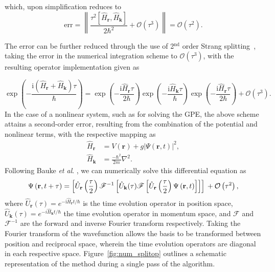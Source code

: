 which, upon simplification reduces to
\begin{equation}
\text{err} = \left\| \frac{\tau^2[{\hat{H}_{\textbf{r}}},{\hat{H}_{\textbf{k}}}]}{2\hbar^2} + \mathcal{O}(\tau^3)\right\| = \mathcal{O}(\tau^2).
\end{equation}

The error can be further reduced through the use of 2$^{\text{nd}}$ order Strang splitting~\cite{NUM:Gradinaru_SIAM_2007}, taking the error in the numerical integration scheme to $\mathcal{O}(\tau^3)$, with the resulting operator implementation given as

\begin{equation}\label{eqn:3}
\exp\left( -\frac{ \textrm{i}\left(\hat{H}_{\textbf{r}} + \hat{H}_{\textbf{k}}\right)\tau}{\hbar} \right) = \exp\left(- \frac{\textrm{i}\hat{H}_{\textbf{r}}\tau}{2\hbar} \right)\exp\left(-\frac{\textrm{i}\hat{H}_{\textbf{k}}\tau}{\hbar}\right)\exp\left( -\frac{\textrm{i}\hat{H}_{\textbf{r}}\tau}{2\hbar}\right) + \mathcal{O}\left(\tau^3\right).
\end{equation}
In the case of a nonlinear system, such as for solving the GPE, the above scheme attains a second-order error, resulting from the combination of the potential and nonlinear terms, with the respective mapping as \cite{BEC:Javanainen_jphysa_2006}
\begin{subequations}
    \begin{align}
\hat{H}_{\textbf{r}} &= V(\mathbf{r}) + g\vert\Psi(\mathbf{r},t)\vert^2, \\ \hat{H}_{\textbf{k}} &= \frac{-\hbar^2}{2m}\nabla^2.
    \end{align}
\end{subequations}
Following Bauke \textit{et al}. \cite{Num:Bauke_cpc_2011}, we can numerically solve this differential equation as
\begin{equation}
\Psi\left(\textbf{r},t+\tau\right) = \left[\hat{U}_{\mathbf{r}}\left(\frac{\tau}{2}\right) \mathscr{F}^{-1} \left[ \hat{U}_{\mathbf{k}}(\tau) \mathscr{F} \left[ \hat{U}_{\mathbf{r}}\left(\frac{\tau}{2}\right) \Psi\left(\mathbf{r},t\right) \right] \right] \right]  \\ + \mathcal{O}\left(\tau^2\right),
\end{equation}
where $\hat{U}_{\mathbf{r}}(\tau)=e^{-\textrm{i}\hat{H}_{\mathbf{r}}t/\hbar}$ is the time evolution operator in position space, $\hat{U}_{\mathbf{k}}(\tau)=e^{-i\hat{H}_{\mathbf{k}}t/\hbar}$ the time evolution operator in momentum space, and $\mathscr{F}$ and $\mathscr{F}^{-1}$ are the forward and inverse Fourier transform respectively. Taking the Fourier transform of the wavefunction allows the basis to be transformed between position and reciprocal space, wherein the time evolution operators are diagonal in each respective space. Figure~\ref{fig:num_splitop} outlines a schematic representation of the method during a single pass of the algorithm.

